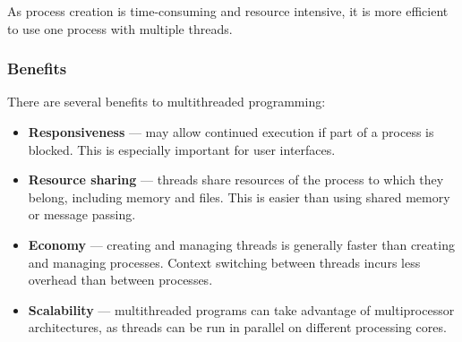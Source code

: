\documentclass{article}
\begin{document}
As process creation is time-consuming and resource intensive, it is
more efficient to use one process with multiple threads.
\subsubsection{Benefits}
There are several benefits to multithreaded programming:
\begin{itemize}
    \item \textbf{Responsiveness} --- may allow continued execution if
          part of a process is blocked. This is especially important
          for user interfaces.
    \item \textbf{Resource sharing} --- threads share resources of the
          process to which they belong, including memory and files.
          This is easier than using shared memory or message passing.
    \item \textbf{Economy} --- creating and managing threads is
          generally faster than creating and managing processes. Context
          switching between threads incurs less overhead than between
          processes.
    \item \textbf{Scalability} --- multithreaded programs can take
          advantage of multiprocessor architectures, as threads can be
          run in parallel on different processing cores.
\end{itemize}
\end{document}
